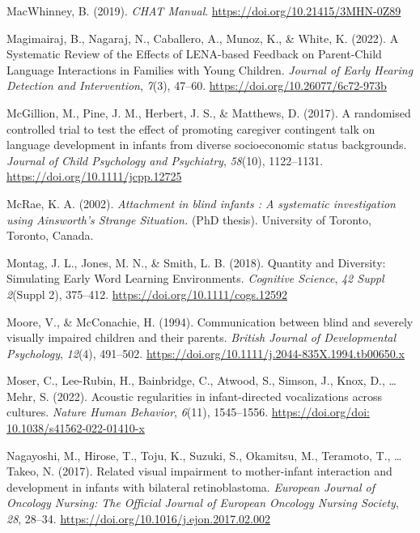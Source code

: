 \documentclass[
  man]{apa6}
\newlength{\cslhangindent}
\newlength{\cslentryspacingunit} %
\newenvironment{CSLReferences}[2] %
 {%
  \setlength{\parindent}{0pt}
  \ifodd #1
  \let\oldpar\par
  \def\par{\hangindent=\cslhangindent\oldpar}
  \fi
  \setlength{\parskip}{#2\cslentryspacingunit}
 }%
 {}
\begin{document}
\begin{CSLReferences}{1}{0}
\leavevmode{}%
MacWhinney, B. (2019). \emph{{CHAT Manual}}. \url{https://doi.org/10.21415/3MHN-0Z89}

\leavevmode{}%
Magimairaj, B., Nagaraj, N., Caballero, A., Munoz, K., \& White, K. (2022). A {Systematic Review} of the {Effects} of {LENA-based Feedback} on {Parent-Child Language Interactions} in {Families} with {Young Children}. \emph{Journal of Early Hearing Detection and Intervention}, \emph{7}(3), 47--60. \url{https://doi.org/10.26077/6c72-973b}

\leavevmode{}%
McGillion, M., Pine, J. M., Herbert, J. S., \& Matthews, D. (2017). A randomised controlled trial to test the effect of promoting caregiver contingent talk on language development in infants from diverse socioeconomic status backgrounds. \emph{Journal of Child Psychology and Psychiatry}, \emph{58}(10), 1122--1131. \url{https://doi.org/10.1111/jcpp.12725}

\leavevmode{}%
McRae, K. A. (2002). \emph{Attachment in blind infants : A systematic investigation using {Ainsworth}'s {Strange Situation}.} (PhD thesis). University of Toronto, Toronto, Canada.

\leavevmode{}%
Montag, J. L., Jones, M. N., \& Smith, L. B. (2018). Quantity and {Diversity}: {Simulating Early Word Learning Environments}. \emph{Cognitive Science}, \emph{42 Suppl 2}(Suppl 2), 375--412. \url{https://doi.org/10.1111/cogs.12592}

\leavevmode{}%
Moore, V., \& McConachie, H. (1994). Communication between blind and severely visually impaired children and their parents. \emph{British Journal of Developmental Psychology}, \emph{12}(4), 491--502. \url{https://doi.org/10.1111/j.2044-835X.1994.tb00650.x}

\leavevmode{}%
Moser, C., Lee-Rubin, H., Bainbridge, C., Atwood, S., Simson, J., Knox, D., \ldots{} Mehr, S. (2022). Acoustic regularities in infant-directed vocalizations across cultures. \emph{Nature Human Behavior}, \emph{6}(11), 1545--1556. \href{https://doi.org/doi:\%2010.1038/s41562-022-01410-x}{https://doi.org/doi: 10.1038/s41562-022-01410-x}

\leavevmode{}%
Nagayoshi, M., Hirose, T., Toju, K., Suzuki, S., Okamitsu, M., Teramoto, T., \ldots{} Takeo, N. (2017). Related visual impairment to mother-infant interaction and development in infants with bilateral retinoblastoma. \emph{European Journal of Oncology Nursing: The Official Journal of European Oncology Nursing Society}, \emph{28}, 28--34. \url{https://doi.org/10.1016/j.ejon.2017.02.002}


\end{CSLReferences}
\end{document}
